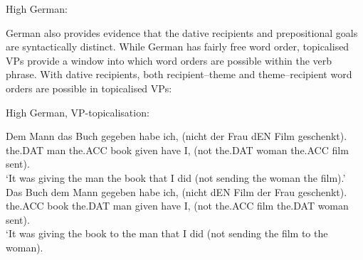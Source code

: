 \begin{exe}
	\ex High German:\label{ex:german-goals}
	\begin{xlist}
	\end{xlist}
\end{exe}

German also provides evidence that the dative recipients and prepositional goals are syntactically distinct. While German has fairly free word order, topicalised VPs provide a window into which word orders are possible within the verb phrase. With dative recipients, both recipient--theme and theme--recipient word orders are possible in topicalised VPs:

	\begin{exe}
		\ex\label{ex:german-VP-top} High German, VP-topicalisation:
		\begin{xlist}
			\ex \gll  Dem Mann das Buch gegeben habe ich, (nicht der Frau dEN Film geschenkt).\\
			the.DAT man the.ACC book given have I, (not the.DAT woman the.ACC film sent).\\
			\trans `It was giving the man the book that I did (not sending the woman the film).'
			\ex \gll Das Buch dem Mann gegeben habe ich, (nicht dEN Film der Frau geschenkt).\\
			the.ACC book the.DAT man given have I, (not the.ACC film the.DAT woman sent).\\
			\trans `It was giving the book to the man that I did (not sending the film to the woman).\\
		\end{xlist}
	\end{exe}

